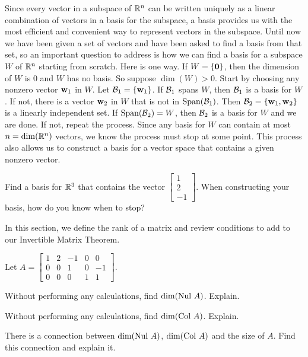\label{sec:find_basis_subspace}

Since every vector in a subspace of $\mathbb{R}^n$ can be written uniquely as a linear combination of vectors in a basis for the subspace, a basis provides us with the most efficient and convenient way to represent vectors in the subspace. Until now we have been given a set of vectors and have been asked to find a basis from that set, so an important question to address is how we can find a basis for a subspace $W$ of $\mathbb{R}^n$ starting from scratch. Here is one way. If $W = \{\mathbf{0}\}$, then the dimension of $W$ is 0 and $W$ has no basis. So suppose $\dim(W) > 0$. Start by choosing any nonzero vector $\mathbf{w}_1$ in $W$. Let $\mathcal{B}_1 = \{\mathbf{w}_1\}$. If $\mathcal{B}_1$ spans $W$, then $\mathcal{B}_1$ is a basis for $W$. If not, there is a vector $\mathbf{w}_2$ in $W$ that is not in $\text{Span}(\mathcal{B}_1)$. Then $\mathcal{B}_2 = \{\mathbf{w}_1, \mathbf{w}_2\}$ is a linearly independent set. If $\text{Span}(\mathcal{B}_2) = W$, then $\mathcal{B}_2$ is a basis for $W$ and we are done. If not, repeat the process. Since any basis for $W$ can contain at most $n=\dim(\mathbb{R}^n)$ vectors, we know the process must stop at some point. This process also allows us to construct a basis for a vector space that contains a given nonzero vector. 



\begin{activity} \label{act:3_d_4} Find a basis for $\mathbb{R}^3$ that contains the vector $\left[ \begin{array}{r} 1 \\ 2 \\ -1 \end{array} \right]$. When constructing your basis, how do you know when to stop? 


\end{activity}


\label{sec:mtx_rank}

In this section, we define the rank of a matrix and review conditions to add to our Invertible Matrix Theorem.



\begin{activity} \label{act:3_d_5} Let $A = \left[ \begin{array}{rrrrr} 1&2&-1&0&0 \\ 0&0&1&0&-1 \\ 0&0&0&1&1 \end{array} \right]$.
\ba
\item Without performing any calculations, find $\dim(\text{Nul } A)$. Explain.



\item Without performing any calculations, find $\dim(\text{Col } A)$. Explain.



\item There is a connection between $\dim(\text{Nul } A)$, $\dim(\text{Col } A)$ and the size of $A$. Find this connection and explain it.



\ea

\end{activity}



